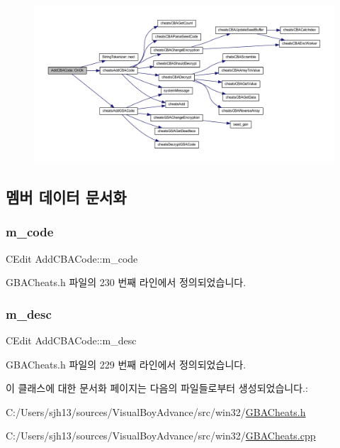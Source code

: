 \nopagebreak
\begin{figure}[H]
\begin{center}
\leavevmode
\includegraphics[width=350pt]{class_add_c_b_a_code_a63c5cc95366a1a0aad123432054f977a_cgraph}
\end{center}
\end{figure}


\subsection{멤버 데이터 문서화}
\mbox{\label{class_add_c_b_a_code_ab4b404e9aed23e5dd265f543e98c9c6c}} 
\subsubsection{\texorpdfstring{m\+\_\+code}{m\_code}}
{\footnotesize\ttfamily C\+Edit Add\+C\+B\+A\+Code\+::m\+\_\+code}



G\+B\+A\+Cheats.\+h 파일의 230 번째 라인에서 정의되었습니다.

\mbox{\label{class_add_c_b_a_code_ab5056f88f9c1f58a20a1ce718599305b}} 
\subsubsection{\texorpdfstring{m\+\_\+desc}{m\_desc}}
{\footnotesize\ttfamily C\+Edit Add\+C\+B\+A\+Code\+::m\+\_\+desc}



G\+B\+A\+Cheats.\+h 파일의 229 번째 라인에서 정의되었습니다.



이 클래스에 대한 문서화 페이지는 다음의 파일들로부터 생성되었습니다.\+:\begin{DoxyCompactItemize}
\item 
C\+:/\+Users/sjh13/sources/\+Visual\+Boy\+Advance/src/win32/\mbox{\hyperlink{_g_b_a_cheats_8h}{G\+B\+A\+Cheats.\+h}}\item 
C\+:/\+Users/sjh13/sources/\+Visual\+Boy\+Advance/src/win32/\mbox{\hyperlink{_g_b_a_cheats_8cpp}{G\+B\+A\+Cheats.\+cpp}}\end{DoxyCompactItemize}
